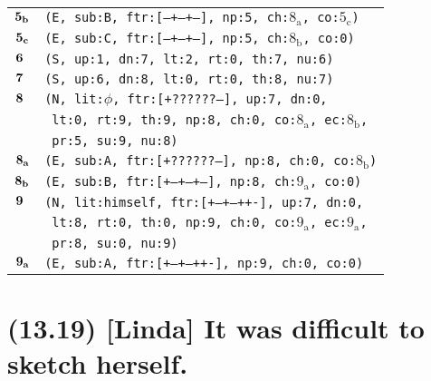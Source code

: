 \documentclass{article}
\begin{document}
\begin{minipage}{\textwidth}
{\begin{tabular}{|r|l|}
    ${\textbf{\textrm{5}}_{\textbf{\textrm{b}}}}$ & \texttt{\texttt{(E,~sub:B,~ftr:[---+--+--],~np:5,~ch:${\textrm{8}_{\textrm{a}}}$,~co:${\textrm{5}_{\textrm{c}}}$)}} \\
    ${\textbf{\textrm{5}}_{\textbf{\textrm{c}}}}$ & \texttt{\texttt{(E,~sub:C,~ftr:[---+--+--],~np:5,~ch:${\textrm{8}_{\textrm{b}}}$,~co:0)}} \\
    ${\textbf{\textrm{6}}_{\phantom{z}}}$ & \texttt{\texttt{(S,~up:1,~dn:7,~lt:2,~rt:0,~th:7,~nu:6)}} \\
    ${\textbf{\textrm{7}}_{\phantom{z}}}$ & \texttt{\texttt{(S,~up:6,~dn:8,~lt:0,~rt:0,~th:8,~nu:7)}} \\
    ${\textbf{\textrm{8}}_{\phantom{z}}}$ & \texttt{\texttt{(N,~lit:$\phi$,~ftr:[+??????--],~up:7,~dn:0,}} \\
    & \texttt{\texttt{~lt:0,~rt:9,~th:9,~np:8,~ch:0,~co:${\textrm{8}_{\textrm{a}}}$,~ec:${\textrm{8}_{\textrm{b}}}$,}} \\
    & \texttt{\texttt{~pr:5,~su:9,~nu:8)}} \\
    ${\textbf{\textrm{8}}_{\textbf{\textrm{a}}}}$ & \texttt{\texttt{(E,~sub:A,~ftr:[+??????--],~np:8,~ch:0,~co:${\textrm{8}_{\textrm{b}}}$)}} \\
    ${\textbf{\textrm{8}}_{\textbf{\textrm{b}}}}$ & \texttt{\texttt{(E,~sub:B,~ftr:[+--+--+--],~np:8,~ch:${\textrm{9}_{\textrm{a}}}$,~co:0)}} \\
    ${\textbf{\textrm{9}}_{\phantom{z}}}$ & \texttt{\texttt{(N,~lit:himself,~ftr:[+--+--++-],~up:7,~dn:0,}} \\
    & \texttt{\texttt{~lt:8,~rt:0,~th:0,~np:9,~ch:0,~co:${\textrm{9}_{\textrm{a}}}$,~ec:${\textrm{9}_{\textrm{a}}}$,}} \\
    & \texttt{\texttt{~pr:8,~su:0,~nu:9)}} \\
    ${\textbf{\textrm{9}}_{\textbf{\textrm{a}}}}$ & \texttt{\texttt{(E,~sub:A,~ftr:[+--+--++-],~np:9,~ch:0,~co:0)}} \\
    \hline
  \end{tabular}
  }
\end{minipage}
\bigbreak

\clearpage

%
%

\section*{(13.19) [Linda] It was difficult to sketch herself.}
\end{document}

